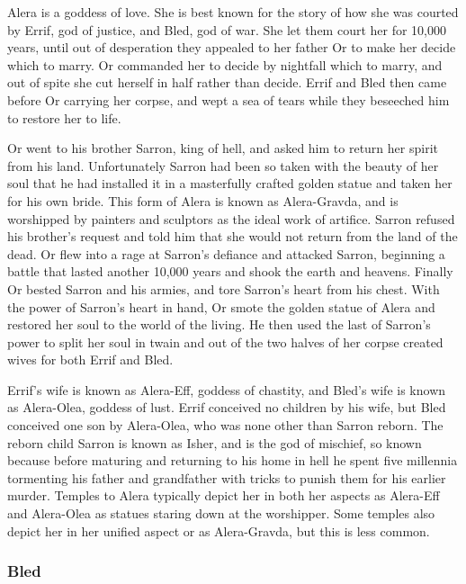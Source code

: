 \documentclass[paper=a4, fontsize=11pt]{scrartcl} %
\begin{document}
\begin{multicols}{2}
Alera is a goddess of love. She is best known for the story of how she was courted by Errif, god of justice, and Bled, god of war. She let them court her for 10,000 years, until out of desperation they appealed to her father Or to make her decide which to marry. Or commanded her to decide by nightfall which to marry, and out of spite she cut herself in half rather than decide. Errif and Bled then came before Or carrying her corpse, and wept a sea of tears while they beseeched him to restore her to life. 

Or went to his brother Sarron, king of hell, and asked him to return her spirit from his land. Unfortunately Sarron had been so taken with the beauty of her soul that he had installed it in a masterfully crafted golden statue and taken her for his own bride. This form of Alera is known as Alera-Gravda, and is worshipped by painters and sculptors as the ideal work of artifice. Sarron refused his brother's request and told him that she would not return from the land of the dead. Or flew into a rage at Sarron's defiance and attacked Sarron, beginning a battle that lasted another 10,000 years and shook the earth and heavens. Finally Or bested Sarron and his armies, and tore Sarron's heart from his chest. With the power of Sarron's heart in hand, Or smote the golden statue of Alera and restored her soul to the world of the living. He then used the last of Sarron's power to split her soul in twain and out of the two halves of her corpse created wives for both Errif and Bled. 

Errif's wife is known as Alera-Eff, goddess of chastity, and Bled's wife is known as Alera-Olea, goddess of lust. Errif conceived no children by his wife, but Bled conceived one son by Alera-Olea, who was none other than Sarron reborn. The reborn child Sarron is known as Isher, and is the god of mischief, so known because before maturing and returning to his home in hell he spent five millennia tormenting his father and grandfather with tricks to punish them for his earlier murder. Temples to Alera typically depict her in both her aspects as Alera-Eff and Alera-Olea as statues staring down at the worshipper. Some temples also depict her in her unified aspect or as Alera-Gravda, but this is less common.

\subsubsection{Bled}


\end{multicols}
\end{document}
